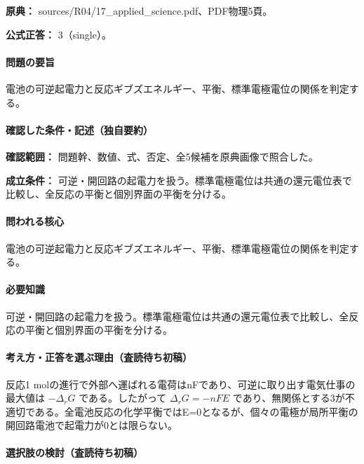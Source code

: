 \noindent\textbf{原典：} sources/R04/17\_applied\_science.pdf、PDF物理5頁。

\textbf{公式正答：} 3（single）。

\paragraph{問題の要旨} 電池の可逆起電力と反応ギブズエネルギー、平衡、標準電極電位の関係を判定する。

\paragraph{確認した条件・記述（独自要約）}\mbox{}\par

\noindent\textbf{確認範囲：} 問題幹、数値、式、否定、全5候補を原典画像で照合した。\par

\noindent\textbf{成立条件：} 可逆・開回路の起電力を扱う。標準電極電位は共通の還元電位表で比較し、全反応の平衡と個別界面の平衡を分ける。\par

\paragraph{問われる核心} 電池の可逆起電力と反応ギブズエネルギー、平衡、標準電極電位の関係を判定する。

\paragraph{必要知識} 可逆・開回路の起電力を扱う。標準電極電位は共通の還元電位表で比較し、全反応の平衡と個別界面の平衡を分ける。

\paragraph{考え方・正答を選ぶ理由（査読待ち初稿）} 反応1 molの進行で外部へ運ばれる電荷はnFであり、可逆に取り出す電気仕事の最大値は \(-\Delta_rG\) である。したがって \(\Delta_rG=-nFE\) であり、無関係とする3が不適切である。全電池反応の化学平衡ではE=\allowbreak{}0となるが、個々の電極が局所平衡の開回路電池で起電力が0とは限らない。

\paragraph{選択肢の検討（査読待ち初稿）}\mbox{}\par

